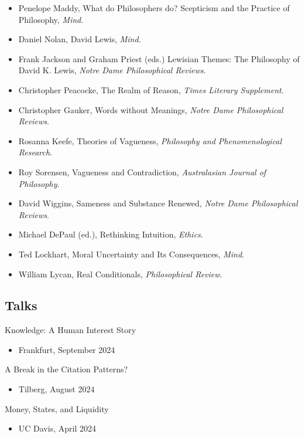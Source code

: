 \documentclass[
  10pt,
  letterpaper,
  DIV=11,
  numbers=noendperiod,
  twoside]{scrartcl}
\providecommand{\tightlist}{%
  \setlength{\itemsep}{0pt}\setlength{\parskip}{0pt}}
\begin{document}
\begin{itemize}
\tightlist
\item
  Penelope Maddy, What do Philosophers do? Scepticism and the Practice
  of Philosophy, \emph{Mind}.
\item
  Daniel Nolan, David Lewis, \emph{Mind}.
\item
  Frank Jackson and Graham Priest (eds.) Lewisian Themes: The Philosophy
  of David K. Lewis, \emph{Notre Dame Philosophical Reviews}.
\item
  Christopher Peacocke, The Realm of Reason, \emph{Times Literary
  Supplement}.
\item
  Christopher Gauker, Words without Meanings, \emph{Notre Dame
  Philosophical Reviews}.
\item
  Rosanna Keefe, Theories of Vagueness, \emph{Philosophy and
  Phenomenological Research}.
\item
  Roy Sorensen, Vagueness and Contradiction, \emph{Australasian Journal
  of Philosophy}.
\item
  David Wiggins, Sameness and Substance Renewed, \emph{Notre Dame
  Philosophical Reviews}.
\item
  Michael DePaul (ed.), Rethinking Intuition, \emph{Ethics}.
\item
  Ted Lockhart, Moral Uncertainty and Its Consequences, \emph{Mind}.
\item
  William Lycan, Real Conditionals, \emph{Philosophical Review}.
\end{itemize}

\newpage

\subsection{Talks}\label{talks}

Knowledge: A Human Interest Story

\begin{itemize}
\tightlist
\item
  Frankfurt, September 2024
\end{itemize}

A Break in the Citation Patterns?

\begin{itemize}
\tightlist
\item
  Tilberg, August 2024
\end{itemize}

Money, States, and Liquidity

\begin{itemize}
\tightlist
\item
  UC Davis, April 2024
\end{itemize}
\end{document}

